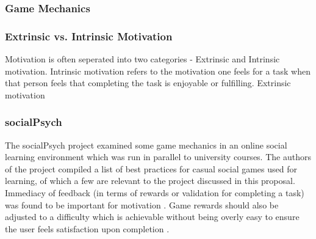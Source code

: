 \subsubsection{Game Mechanics} \label{background_gamemechanics}
\subsubsection{Extrinsic vs. Intrinsic Motivation}
Motivation is often seperated into two categories - Extrinsic and Intrinsic motivation. Intrinsic motivation refers to the motivation one feels for a task when that person feels that completing the task is enjoyable or fulfilling. Extrinsic motivation 
\subsubsection{socialPsych}
The socialPsych\cite{landers_casual_2011} project examined some game mechanics
in an online social learning environment which was run in parallel to university
courses. The authors of the project compiled a list of best practices
for casual social games used for learning, of which a few are relevant to
the project discussed in this proposal. Immediacy of feedback (in terms of
rewards or validation for completing a task) was found to be important for
motivation \cite[p. 419]{landers_casual_2011}. Game rewards should also be adjusted
to a difficulty which is achievable without being overly easy to ensure the user
feels satisfaction upon completion \cite[p. 420]{landers_casual_2011}.
